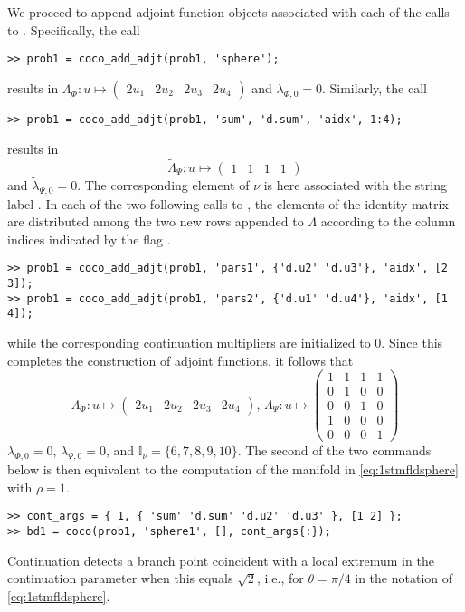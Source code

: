 We proceed to append adjoint function objects associated with each of the calls to . Specifically, the call
\begin{lstlisting}[language=coco-highlight]
>> prob1 = coco_add_adjt(prob1, 'sphere');
\end{lstlisting}
results in $\tilde{\Lambda}_\Phi:u\mapsto\left(\begin{array}{cccc}2u_1 & 2u_2 & 2u_3 & 2u_4\end{array}\right)$ and $\tilde{\lambda}_{\Phi,0}=0$.
Similarly, the call
\begin{lstlisting}[language=coco-highlight]
>> prob1 = coco_add_adjt(prob1, 'sum', 'd.sum', 'aidx', 1:4);
\end{lstlisting}
results in 
\begin{equation}
\tilde{\Lambda}_\Psi:u\mapsto\left(\begin{array}{cccc}1 & 1 & 1 & 1\end{array}\right)
\end{equation}
and $\tilde{\lambda}_{\Psi,0}=0$. The corresponding element of $\nu$ is here associated with the string label . In each of the two following calls to , the elements of the identity matrix are distributed among the two new rows appended to $\Lambda$ according to the column indices indicated by the flag .
\begin{lstlisting}[language=coco-highlight]
>> prob1 = coco_add_adjt(prob1, 'pars1', {'d.u2' 'd.u3'}, 'aidx', [2 3]);
>> prob1 = coco_add_adjt(prob1, 'pars2', {'d.u1' 'd.u4'}, 'aidx', [1 4]);
\end{lstlisting}
while the corresponding continuation multipliers are initialized to $0$. Since this completes the construction of adjoint functions, it follows that
\begin{equation}
\Lambda_\Phi:u\mapsto\left(\begin{array}{cccc}2u_1 & 2u_2 & 2u_3 & 2u_4\end{array}\right),\,\Lambda_\Psi:u\mapsto\left(\begin{array}{cccc}1 & 1 & 1 & 1\\0 & 1 & 0 & 0\\0 & 0 & 1 & 0\\1 & 0 & 0 & 0\\0 & 0 & 0 & 1\end{array}\right)
\end{equation}
$\lambda_{\Phi,0}=0$, $\lambda_{\Psi,0}=0$, and $\mathbb{I}_\nu=\{6,7,8,9,10\}$. The second of the two commands below is then equivalent to the computation of the manifold in \eqref{eq:1stmfldsphere} with $\rho=1$.
\begin{lstlisting}[language=coco-highlight]
>> cont_args = { 1, { 'sum' 'd.sum' 'd.u2' 'd.u3' }, [1 2] };
>> bd1 = coco(prob1, 'sphere1', [], cont_args{:});
\end{lstlisting}
Continuation detects a branch point coincident with a local extremum in the continuation parameter  when this equals $\sqrt{2}$, i.e., for $\theta=\pi/4$ in the notation of \eqref{eq:1stmfldsphere}. 

